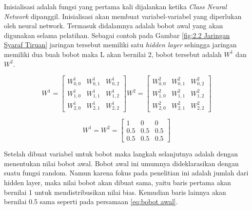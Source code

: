 Inisialisasi adalah fungsi yang pertama kali dijalankan ketika \textit{Class Neural Network} dipanggil. Inisialisasi akan membuat variabel-variabel yang diperlukan oleh neural network. Termasuk didalamnya adalah bobot awal yang akan digunakan selama pelatihan. Sebagai contoh pada Gambar \ref{fig:2.2 Jaringan Syaraf Tiruan} jaringan tersebut memiliki satu \textit{hidden layer} sehingga jaringan memiliki dua buah bobot maka L akan bernilai 2, bobot tersebut adalah $W^1$ dan $W^2$.

\begin{equation}
    W^1 = 
    \begin{bmatrix}
        W^1_{0,0} & W^1_{0,1} & W^1_{0,2} \\
        W^1_{1,0} & W^1_{1,1} & W^1_{1,2} \\
        W^1_{2,0} & W^1_{2,1} & W^1_{2,2}
    \end{bmatrix}
     W^2 = 
    \begin{bmatrix}
        W^2_{0,0} & W^2_{0,1} & W^2_{0,2} \\
        W^2_{1,0} & W^2_{1,1} & W^2_{1,2} \\
        W^2_{2,0} & W^2_{2,1} & W^2_{2,2}
    \end{bmatrix}
\end{equation}

\begin{equation}
    W^1 = W^2 =  
    \begin{bmatrix}
        1 & 0 & 0 \\
        0.5 & 0.5 & 0.5 \\
        0.5 & 0.5 & 0.5
    \end{bmatrix}
    \label{eq:bobot awal}
\end{equation}

Setelah dibuat variabel untuk bobot maka langkah selanjutnya adalah dengan menentukan nilai bobot awal. Bobot awal ini umumnya dideklarasikan dengan suatu fungsi random. Namun karena fokus pada penelitian ini adalah jumlah dari hidden layer, maka nilai bobot akan dibuat sama, yaitu baris pertama akan bernilai 1 untuk mendistribusikan nilai bias. Kemudian baris lainnya akan bernilai 0.5 sama seperti pada persamaan \ref{eq:bobot awal}. 

